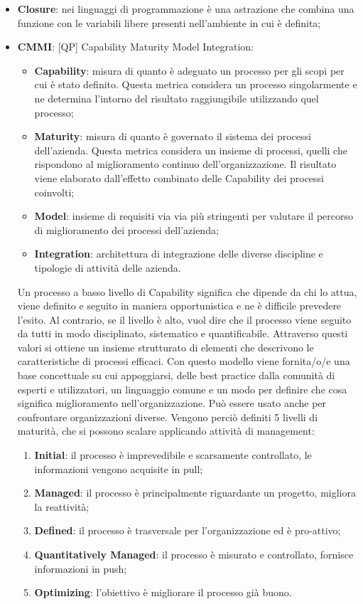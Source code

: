 \begin{itemize}
		\item \textbf{Closure}: nei linguaggi di programmazione è una astrazione che combina una funzione con le variabili libere presenti nell'ambiente in cui è definita;
		\item \textbf{CMMI}: [QP] Capability Maturity Model Integration:
			\begin{itemize}
				\item \textbf{Capability}: misura di quanto è adeguato un processo per gli scopi per cui è stato definito. Questa metrica considera un processo singolarmente e ne determina l'intorno del risultato raggiungibile utilizzando quel processo;
				\item \textbf{Maturity}: misura di quanto è governato il sistema dei processi dell'azienda. Questa metrica considera un insieme di processi, quelli che rispondono al miglioramento continuo dell'organizzazione. Il risultato viene elaborato dall'effetto combinato delle Capability dei processi coinvolti;
				\item \textbf{Model}: insieme di requisiti via via più stringenti per valutare il percorso di miglioramento dei processi dell'azienda;
				\item \textbf{Integration}: architettura di integrazione delle diverse discipline e tipologie di attività delle azienda.
			\end{itemize}
			\noindent
		Un processo a basso livello di Capability significa che dipende da chi lo attua, viene definito e seguito in maniera opportunistica e ne è difficile prevedere l'esito. Al contrario, se il livello è alto, vuol dire che il processo viene seguito da tutti in modo disciplinato, sistematico e quantificabile. Attraverso questi valori si ottiene un insieme strutturato di elementi che descrivono le caratteristiche di processi efficaci. Con questo modello viene fornita/o/e una base concettuale su cui appoggiarsi, delle best practice dalla comunità di esperti e utilizzatori, un linguaggio comune e un modo per definire che cosa significa miglioramento nell'organizzazione. \newline
		Può essere usato anche per confrontare organizzazioni diverse. \newline
		Vengono perciò definiti 5 livelli di maturità, che si possono scalare applicando attività di management:
			\begin{enumerate}
				\item \textbf{Initial}: il processo è imprevedibile e scarsamente controllato, le informazioni vengono acquisite in pull;
				\item \textbf{Managed}: il processo è principalmente riguardante un progetto, migliora la reattività;
				\item \textbf{Defined}: il processo è trasversale per l'organizzazione ed è pro-attivo;
				\item \textbf{Quantitatively Managed}: il processo è misurato e controllato, fornisce informazioni in push;
				\item \textbf{Optimizing}: l'obiettivo è migliorare il processo già buono.
			\end{enumerate}


\end{itemize}
